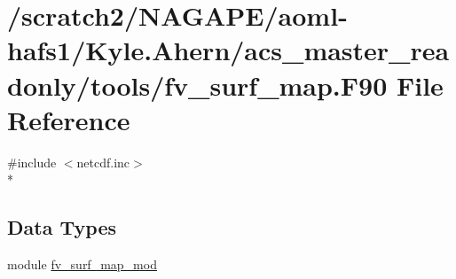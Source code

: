 \section{/scratch2/\-N\-A\-G\-A\-P\-E/aoml-\/hafs1/\-Kyle.Ahern/acs\-\_\-master\-\_\-readonly/tools/fv\-\_\-surf\-\_\-map.F90 File Reference}
\label{fv__surf__map_8F90}
{\ttfamily \#include $<$netcdf.\-inc$>$}\\*
\subsection*{Data Types}
\begin{DoxyCompactItemize}
\item 
module \hyperlink{classfv__surf__map__mod}{fv\-\_\-surf\-\_\-map\-\_\-mod}
\end{DoxyCompactItemize}
